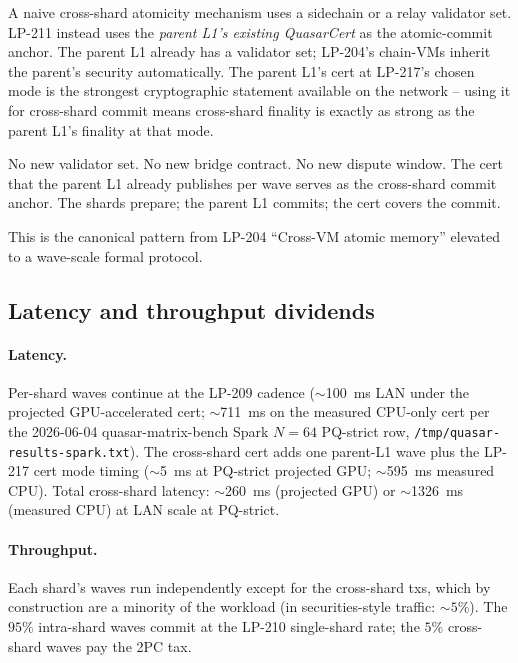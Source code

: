 A naive cross-shard atomicity mechanism uses a sidechain or a relay
validator set. LP-211 instead uses the \emph{parent L1's existing
QuasarCert} as the atomic-commit anchor. The parent L1 already has a
validator set; LP-204's chain-VMs inherit the parent's security
automatically. The parent L1's cert at LP-217's chosen mode is the
strongest cryptographic statement available on the network -- using
it for cross-shard commit means cross-shard finality is exactly as
strong as the parent L1's finality at that mode.

No new validator set. No new bridge contract. No new dispute window.
The cert that the parent L1 already publishes per wave serves as
the cross-shard commit anchor. The shards prepare; the parent L1
commits; the cert covers the commit.

This is the canonical pattern from LP-204 ``Cross-VM atomic memory''
elevated to a wave-scale formal protocol.

\subsection{Latency and throughput dividends}

\paragraph{Latency.} Per-shard waves continue at the LP-209 cadence
($\sim$\SI{100}{\milli\second} LAN under the projected GPU-accelerated
cert; $\sim$\SI{711}{\milli\second} on the measured CPU-only cert
per the 2026-06-04 quasar-matrix-bench Spark $N{=}64$ PQ-strict
row, \texttt{/tmp/quasar-results-spark.txt}). The cross-shard cert
adds one parent-L1 wave plus the LP-217 cert mode timing
($\sim$\SI{5}{\milli\second} at PQ-strict projected GPU;
$\sim$\SI{595}{\milli\second} measured CPU). Total cross-shard
latency: $\sim$\SI{260}{\milli\second} (projected GPU) or
$\sim$\SI{1326}{\milli\second} (measured CPU) at LAN scale at
PQ-strict.

\paragraph{Throughput.} Each shard's waves run independently except
for the cross-shard txs, which by construction are a minority of the
workload (in securities-style traffic: $\sim 5\%$). The $95\%$
intra-shard waves commit at the LP-210 single-shard rate; the $5\%$
cross-shard waves pay the 2PC tax.
